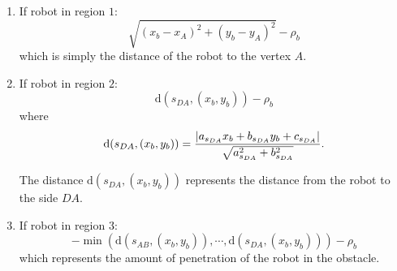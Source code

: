 \documentclass[eprint]{actapoly}
\begin{document}
\begin{enumerate}
\begin{enumerate}
	   	\item If robot in region $1$:
   	   	\begin{equation*}
    	    \sqrt{(x_{b} - x_{A})^2 + (y_{b} - y_{A})^2} - \rho_b
	    \end{equation*}
	    which is simply the distance of the robot to the vertex $A$.
	    
	    \item If robot in region $2$:
%	    
		\begin{equation*}
			\mathrm{d}(s_{DA}, (x_{b}, y_{b})) - \rho_b
		\end{equation*}
		where
   	   	\begin{equation*}
    	    \mathrm{d}(s_{DA}, (x_{b}, y_{b})) =\\ \frac{|a_{s_{DA}}x_{b} + b_{s_{DA}}y_{b}
    	    + c_{s_{DA}}|}{\sqrt{a_{s_{DA}}^2 + b_{s_{DA}}^2}}.
	    \end{equation*}
	    
	    The distance $\mathrm{d}(s_{DA}, (x_{b}, y_{b}))$ represents the distance from the robot to the side $DA$.
	    
	    \item If robot in region $3$:
   	   	\begin{equation*}
    	    -\min\left(\mathrm{d}(s_{AB}, (x_{b}, y_{b})), \cdots, \mathrm{d}(s_{DA}, (x_{b}, y_{b}))\right) - \rho_b
	    \end{equation*}
	    which represents the amount of penetration of the robot in the obstacle.
	    
    \end{enumerate}
    
    
    \begin{figure}[!h]
	\centering
	{
	    }
\end{figure}
\end{enumerate}
\end{document}
